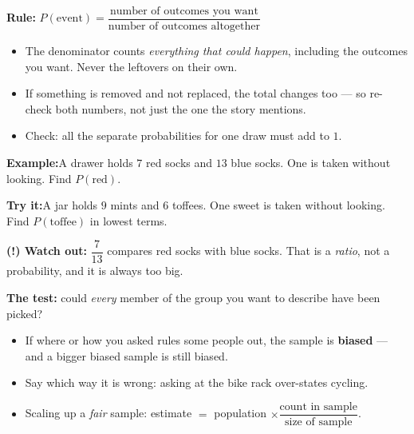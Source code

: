 \documentclass[12pt]{article}
\begin{document}


\begin{formulabox}
\textbf{Rule:} \quad
$P(\text{event}) = \dfrac{\text{number of outcomes you want}}{\text{number of
outcomes altogether}}$
\begin{itemize}[leftmargin=0.8cm, itemsep=1pt, topsep=2pt]
  \item The denominator counts \emph{everything that could happen}, including
        the outcomes you want. Never the leftovers on their own.
  \item If something is removed and not replaced, the total changes too --- so
        re-check both numbers, not just the one the story mentions.
  \item Check: all the separate probabilities for one draw must add to $1$.
\end{itemize}
\end{formulabox}

\begin{examplebox}
\textbf{Example:}\quad A drawer holds $7$ red socks and $13$ blue socks. One is
taken without looking. Find $P(\text{red})$.
\end{examplebox}

\begin{tryitbox}
\textbf{Try it:}\quad A jar holds $9$ mints and $6$ toffees. One sweet is taken
without looking. Find $P(\text{toffee})$ in lowest terms.\\[2pt]
\end{tryitbox}

\begin{watchoutbox}
\textbf{(!) Watch out:} $\dfrac{7}{13}$ compares red socks with blue socks. That
is a \emph{ratio}, not a probability, and it is always too big.
\end{watchoutbox}


\begin{formulabox}
\textbf{The test:} could \emph{every} member of the group you want to describe
have been picked?
\begin{itemize}[leftmargin=0.8cm, itemsep=1pt, topsep=2pt]
  \item If where or how you asked rules some people out, the sample is
        \textbf{biased} --- and a bigger biased sample is still biased.
  \item Say which way it is wrong: asking at the bike rack over-states cycling.
  \item Scaling up a \emph{fair} sample: \quad
        estimate $=$ population $\times \dfrac{\text{count in sample}}{\text{size
        of sample}}$.
\end{itemize}
\end{formulabox}
\end{document}
